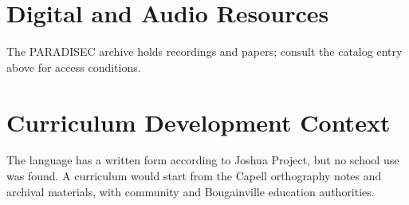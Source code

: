 \documentclass[12pt]{article}
\begin{document}
\section{Digital and Audio Resources}
The PARADISEC archive holds recordings and papers; consult the catalog entry above for access conditions.

\section{Curriculum Development Context}
The language has a written form according to Joshua Project, but no school use was found. A curriculum would start from the Capell orthography notes and archival materials, with community and Bougainville education authorities.
\end{document}
